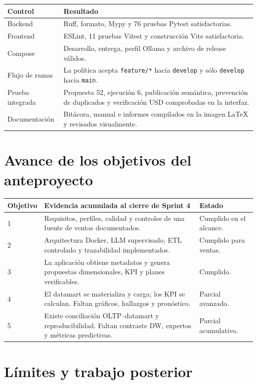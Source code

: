 \documentclass[11pt,letterpaper]{article}
\newcommand{\file}[1]{\texttt{#1}}
\begin{document}
\begin{tabularx}{\textwidth}{@{}p{}X@{}}
  \toprule
  Control & Resultado \\
  \midrule
  Backend & Ruff, formato, Mypy y 76 pruebas Pytest satisfactorias. \\
  Frontend & ESLint, 11 pruebas Vitest y construcción Vite satisfactoria. \\
  Compose & Desarrollo, entrega, perfil Ollama y archivo de release válidos. \\
  Flujo de ramas & La política acepta \file{feature/*} hacia \file{develop} y sólo \file{develop} hacia \file{main}. \\
  Prueba integrada & Propuesta 52, ejecución 6, publicación semántica, prevención de duplicados y verificación USD comprobadas en la interfaz. \\
  Documentación & Bitácora, manual e informes compilados en la imagen LaTeX y revisados visualmente. \\
  \bottomrule
\end{tabularx}

\section{Avance de los objetivos del anteproyecto}

\begin{tabularx}{\textwidth}{@{}p{}p{}X@{}}
  \toprule
  Objetivo & Evidencia acumulada al cierre de Sprint 4 & Estado \\
  \midrule
  1 & Requisitos, perfiles, calidad y controles de una fuente de ventas documentados. & Cumplido en el alcance. \\
  2 & Arquitectura Docker, LLM supervisado, ETL controlado y trazabilidad implementados. & Cumplido para ventas. \\
  3 & La aplicación obtiene metadatos y genera propuestas dimensionales, KPI y planes verificables. & Cumplido. \\
  4 & El datamart se materializa y carga; los KPI se calculan. Faltan gráficos, hallazgos y pronóstico. & Parcial avanzado. \\
  5 & Existe conciliación OLTP--datamart y reproducibilidad. Faltan contraste DW, expertos y métricas predictivas. & Parcial acumulativo. \\
  \bottomrule
\end{tabularx}

\section{Límites y trabajo posterior}
\end{document}
